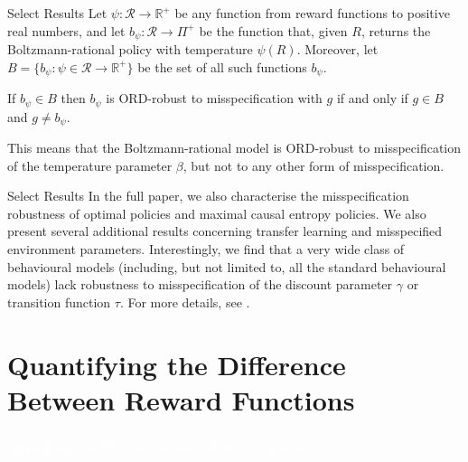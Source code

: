 \documentclass{beamer}
\begin{document}
\begin{frame}{Select Results}
    \small
    Let $\psi : \mathcal{R} \rightarrow \mathbb{R}^+$ be any function from reward functions to positive real numbers, and let $b_\psi : \mathcal{R} \rightarrow \Pi^+$ be the function that, given $R$, returns the Boltzmann-rational policy with temperature $\psi(R)$. Moreover, let $B = \{b_\psi : \psi \in \mathcal{R} \rightarrow \mathbb{R}^+\}$ be the set of all such functions $b_\psi$. 

    \begin{theorem}
    If $b_\psi \in B$ then $b_\psi$ is $\mathrm{ORD}$-robust to misspecification with $g$ if and only if $g \in B$ and $g \neq b_\psi$.
    \end{theorem}
    
    This means that the Boltzmann-rational model is $\mathrm{ORD}$-robust to misspecification of the temperature parameter $\beta$, but not to any other form of misspecification.
\end{frame}

\begin{frame}{Select Results}
    \small
    In the full paper, we also characterise the misspecification robustness of optimal policies and maximal causal entropy policies. We also present several additional results concerning transfer learning and misspecified environment parameters.
    \newline\newline
    Interestingly, we find that a very wide class of behavioural models (including, but not limited to, all the standard behavioural models) lack robustness to misspecification of the discount parameter $\gamma$ or transition function $\tau$.
    \newline\newline
    For more details, see \citet{Skalse_Abate_2023}.
\end{frame}

\section{Quantifying the Difference Between Reward Functions}

\begin{frame}
    \frametitle{}
    \centering
    \Large
    \textcolor{white}{Quantifying the Difference Between Reward Functions}
\end{frame}
\end{document}
